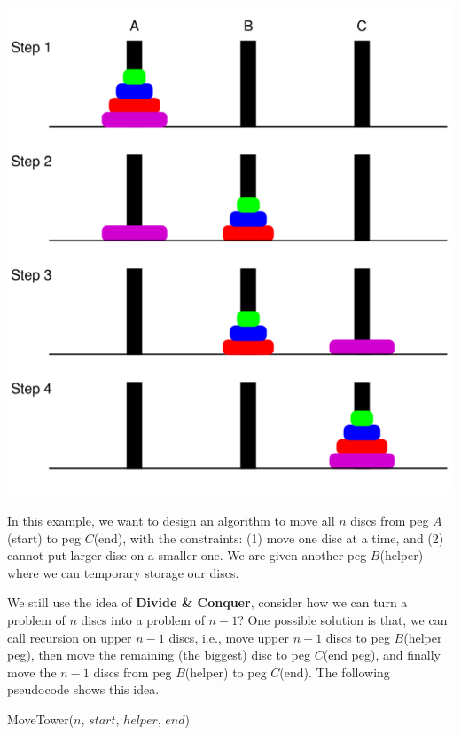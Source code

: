\documentclass[11pt, a4paper]{COMP3711}
\begin{document}
\begin{spacing}{1.5}
    \includegraphics[scale=0.28]{images/02-hanoi.jpeg}
    
    In this example, we want to design an algorithm to 
    move all $n$ discs from peg $A$(start) to peg $C$(end), with the 
    constraints: (1) move one disc at a time, and 
    (2) cannot put larger disc on a smaller one.
    We are given another peg $B$(helper) where we can 
    temporary storage our discs.

    We still use the idea of {\bf Divide \& Conquer},
    consider how we can turn a problem of $n$ discs 
    into a problem of $n-1$? One possible solution is that,
    we can call recursion on upper $n-1$ discs, i.e., 
    move upper $n-1$ discs to peg $B$(helper peg), then move the remaining
    (the biggest) disc to peg $C$(end peg), and finally 
    move the $n-1$ discs from peg $B$(helper) to peg $C$(end).
    The following pseudocode shows this idea.

    \begin{algorithm*}
        \caption{MoveTower($n$, $start$, $helper$, $end$)}
\end{algorithm*}
\end{spacing}
\end{document}
